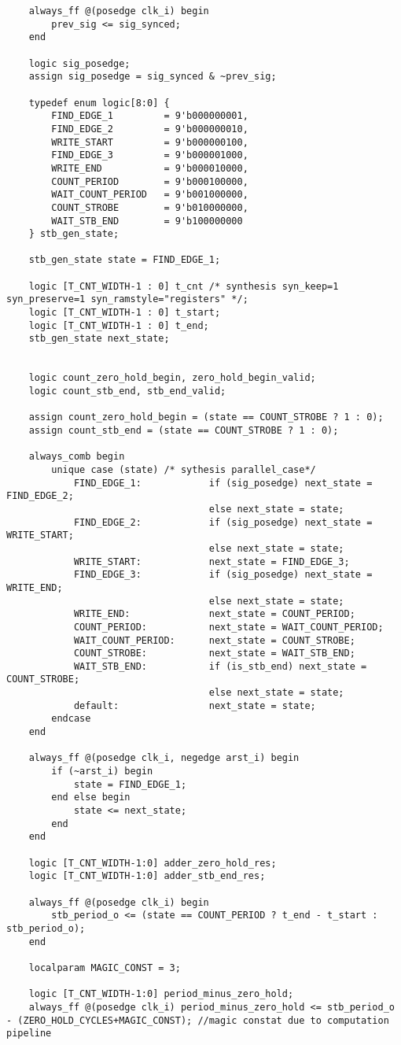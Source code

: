 \begin{lstlisting}
	always_ff @(posedge clk_i) begin
		prev_sig <= sig_synced;
	end

	logic sig_posedge;
	assign sig_posedge = sig_synced & ~prev_sig;

	typedef enum logic[8:0] { 
		FIND_EDGE_1 		= 9'b000000001, 
		FIND_EDGE_2 		= 9'b000000010,
		WRITE_START 		= 9'b000000100,
		FIND_EDGE_3 		= 9'b000001000, 
		WRITE_END			= 9'b000010000,
		COUNT_PERIOD 		= 9'b000100000, 
		WAIT_COUNT_PERIOD 	= 9'b001000000,
		COUNT_STROBE 		= 9'b010000000,
		WAIT_STB_END 		= 9'b100000000
	} stb_gen_state;

	stb_gen_state state = FIND_EDGE_1;

	logic [T_CNT_WIDTH-1 : 0] t_cnt /* synthesis syn_keep=1 syn_preserve=1 syn_ramstyle="registers" */;
	logic [T_CNT_WIDTH-1 : 0] t_start;
	logic [T_CNT_WIDTH-1 : 0] t_end;
	stb_gen_state next_state;


	logic count_zero_hold_begin, zero_hold_begin_valid;
	logic count_stb_end, stb_end_valid;

	assign count_zero_hold_begin = (state == COUNT_STROBE ? 1 : 0);
	assign count_stb_end = (state == COUNT_STROBE ? 1 : 0);

	always_comb begin
		unique case (state) /* sythesis parallel_case*/
			FIND_EDGE_1:			if (sig_posedge) next_state = FIND_EDGE_2;
									else next_state = state;
			FIND_EDGE_2:			if (sig_posedge) next_state = WRITE_START;
									else next_state = state;
			WRITE_START:			next_state = FIND_EDGE_3;
			FIND_EDGE_3:			if (sig_posedge) next_state = WRITE_END;
									else next_state = state;
			WRITE_END:				next_state = COUNT_PERIOD;
			COUNT_PERIOD:			next_state = WAIT_COUNT_PERIOD;
			WAIT_COUNT_PERIOD:		next_state = COUNT_STROBE;
			COUNT_STROBE:			next_state = WAIT_STB_END;
			WAIT_STB_END:			if (is_stb_end) next_state = COUNT_STROBE;
									else next_state = state;
			default:				next_state = state;
		endcase
	end

	always_ff @(posedge clk_i, negedge arst_i) begin
		if (~arst_i) begin
			state = FIND_EDGE_1;
		end else begin
			state <= next_state;
		end
	end

	logic [T_CNT_WIDTH-1:0] adder_zero_hold_res;
	logic [T_CNT_WIDTH-1:0] adder_stb_end_res;

	always_ff @(posedge clk_i) begin
		stb_period_o <= (state == COUNT_PERIOD ? t_end - t_start : stb_period_o);
	end

	localparam MAGIC_CONST = 3;

	logic [T_CNT_WIDTH-1:0] period_minus_zero_hold;
	always_ff @(posedge clk_i) period_minus_zero_hold <= stb_period_o - (ZERO_HOLD_CYCLES+MAGIC_CONST); //magic constat due to computation pipeline


\end{lstlisting}
